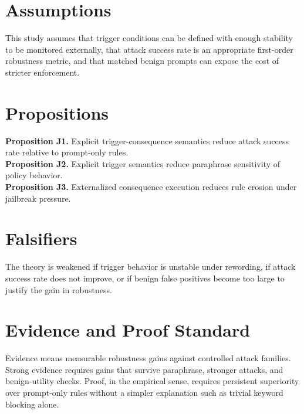 \documentclass[11pt]{article}
\begin{document}
\section{Assumptions}
This study assumes that trigger conditions can be defined with enough stability to be monitored externally, that attack success rate is an appropriate first-order robustness metric, and that matched benign prompts can expose the cost of stricter enforcement.

\section{Propositions}
\textbf{Proposition J1.} Explicit trigger-consequence semantics reduce attack success rate relative to prompt-only rules.\\
\textbf{Proposition J2.} Explicit trigger semantics reduce paraphrase sensitivity of policy behavior.\\
\textbf{Proposition J3.} Externalized consequence execution reduces rule erosion under jailbreak pressure.

\section{Falsifiers}
The theory is weakened if trigger behavior is unstable under rewording, if attack success rate does not improve, or if benign false positives become too large to justify the gain in robustness.

\section{Evidence and Proof Standard}
Evidence means measurable robustness gains against controlled attack families. Strong evidence requires gains that survive paraphrase, stronger attacks, and benign-utility checks. Proof, in the empirical sense, requires persistent superiority over prompt-only rules without a simpler explanation such as trivial keyword blocking alone.

\nocite{*}


\end{document}

